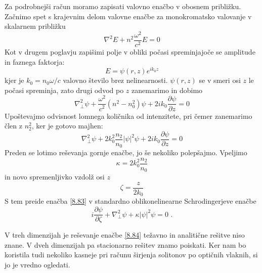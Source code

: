 \documentclass[11pt,fleqn]{book} %
\begin{document}
Za podrobnejši račun moramo zapisati valovno enačbo v obosnem približku.
Začnimo spet s krajevnim delom valovne enačbe za monokromatsko valovanje
v skalarnem približku 
\begin{equation}
\nabla^{2}E+n^{2}\frac{\omega^{2}}{c^{2}}E=0\label{8.80}
\end{equation}
 Kot v drugem poglavju zapišimi polje v obliki počasi spreminjajoče
se amplitude in faznega faktorja: 
\begin{equation}
E=\psi(r,z)e^{ik_{0}z}\label{8.81}
\end{equation}
 kjer je $k_{0}=n_{0}\omega/c$ valovno število brez nelinearnosti.
$\psi(r,z)$ se v smeri osi $z$ le počasi spreminja, zato drugi odvod
po $z$ zanemarimo in dobimo 
\begin{equation}
\nabla_{\bot}^{2}\psi+\frac{\omega^{2}}{c^{2}}(n^{2}-n_{0}^{2})\psi+2ik_{0}\frac{\partial\psi}{\partial z}=0\label{8.82}
\end{equation}
 Upoštevajmo odvisnost lomnega količnika od intenzitete, pri čemer
zanemarimo člen z $n_{2}^{2}$, ker je gotovo majhen: 
\begin{equation}
\nabla_{\bot}^{2}\psi+2k_{0}^{2}\frac{n_{2}}{n_{0}}|\psi|^{2}\psi+2ik_{0}\frac{\partial\psi}{\partial z}=0\label{8.83}
\end{equation}
 Preden se lotimo reševanja gornje enačbe, jo še nekoliko polepšajmo.
Vpeljimo 
\begin{equation}
\kappa=2k_{0}^{2}\frac{n_{2}}{n_{0}}
\end{equation}
 in novo spremenljivko vzdolž osi $z$
\begin{equation}
\zeta=\frac{z}{2k_{0}}
\end{equation}
 S tem preide enačba \ref{8.83} v standardno oblikonelinearne Schrodingerjeve
enačbe 
\begin{equation}
i\frac{\partial\psi}{\partial\zeta}+\nabla_{\bot}^{2}\psi+\kappa\left|\psi\right|^{2}\psi=0\text{ .}\label{8.84}
\end{equation}


V treh dimenzijah je reševanje enačbe \ref{8.84} težavno in analitične
rešitve niso znane. V dveh dimenzijah pa stacionarno rešitev znamo
poiskati. Ker nam bo koristila tudi nekoliko kasneje pri računu širjenja
solitonov po optičnih vlaknih, si jo je vredno ogledati.
\end{document}
